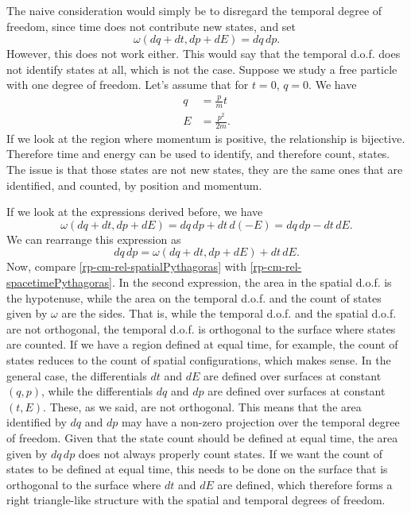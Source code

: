 The naive consideration would simply be to disregard the temporal degree of freedom, since time does not contribute new states, and set
\begin{equation}
	\omega(dq + dt, dp + dE) = dq \, dp.
\end{equation}
However, this does not work either. This would say that the temporal d.o.f. does not identify states at all, which is not the case. Suppose we study a free particle with one degree of freedom. Let's assume that for $t=0$, $q=0$. We have
\begin{equation}
	\begin{aligned}
	q &= \frac{p}{m} t \\
	E &= \frac{p^2}{2m}.
	\end{aligned}
\end{equation}
If we look at the region where momentum is positive, the relationship is bijective. Therefore time and energy can be used to identify, and therefore count, states. The issue is that those states are not new states, they are the same ones that are identified, and counted, by position and momentum.

If we look at the expressions derived before, we have
\begin{equation}
	\omega(dq + dt, dp + dE) = dq \, dp + dt \, d(-E) = dq \, dp - dt \, dE.
\end{equation}
We can rearrange this expression as
\begin{equation}\label{rp-cm-rel-spacetimePythagoras}
	dq \, dp = \omega(dq + dt, dp + dE) + dt \, dE.
\end{equation}
Now, compare \ref{rp-cm-rel-spatialPythagoras} with \ref{rp-cm-rel-spacetimePythagoras}. In the second expression, the area in the spatial d.o.f. is the hypotenuse, while the area on the temporal d.o.f. and the count of states given by $\omega$ are the sides. That is, while the temporal d.o.f. and the spatial d.o.f. are not orthogonal, the temporal d.o.f. is orthogonal to the surface where states are counted. If we have a region defined at equal time, for example, the count of states reduces to the count of spatial configurations, which makes sense. In the general case, the differentials $dt$ and $dE$ are defined over surfaces at constant $(q, p)$, while the differentials $dq$ and $dp$ are defined over surfaces at constant $(t,E)$. These, as we said, are not orthogonal. This means that the area identified by $dq$ and $dp$ may have a non-zero projection over the temporal degree of freedom. Given that the state count should be defined at equal time, the area given by $dq \, dp$ does not always properly count states. If we want the count of states to be defined at equal time, this needs to be done on the surface that is orthogonal to the surface where $dt$ and $dE$ are defined, which therefore forms a right triangle-like structure with the spatial and temporal degrees of freedom.

